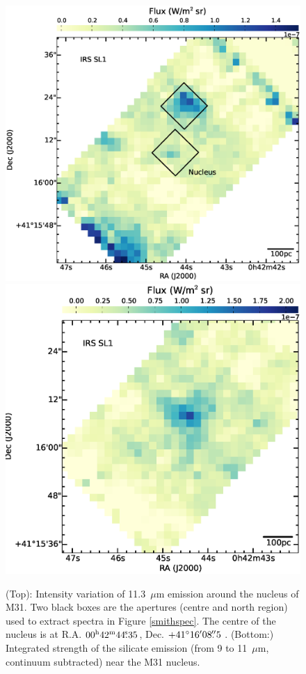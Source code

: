 \begin{figure}
\centering
\includegraphics[width = 8 cm]{./nuc11_3.eps}
\includegraphics[scale = 0.3]{./NUCsilicate.eps}
\caption{(Top): Intensity variation of 11.3~$\mu$m emission around the nucleus of M31. 
Two black boxes are the apertures (centre and north region) used to extract spectra in Figure \ref{smithspec}. 
The centre of the nucleus is at R.A. $00^{\rm h}42^{\rm m}44\fs35$, Dec. $+41\hbox{$^\circ$}16\hbox{$^\prime$}08\hbox{$.\!\!^{\prime\prime}$}5$ \citep{NucleusREF}. %
(Bottom:) Integrated strength of the silicate emission (from 9 to 11~$\mu$m, continuum subtracted) near the M31 nucleus.} %
\label{nuc11}
\end{figure}




